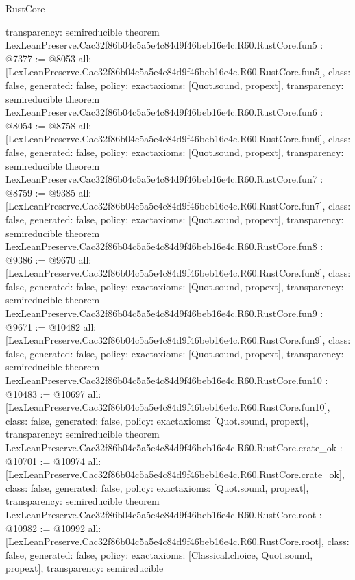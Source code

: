 \begin{lexlean}{RustCore}
\begin{coremodule}
{  transparency: semireducible
}
theorem LexLeanPreserve.Cac32f86b04c5a5e4c84d9f46beb16e4c.R60.RustCore.fun5 : @7377 := @8053 {
  all: [LexLeanPreserve.Cac32f86b04c5a5e4c84d9f46beb16e4c.R60.RustCore.fun5],
  class: false,
  generated: false,
  policy: exact{axioms: [Quot.sound, propext]},
  transparency: semireducible
}
theorem LexLeanPreserve.Cac32f86b04c5a5e4c84d9f46beb16e4c.R60.RustCore.fun6 : @8054 := @8758 {
  all: [LexLeanPreserve.Cac32f86b04c5a5e4c84d9f46beb16e4c.R60.RustCore.fun6],
  class: false,
  generated: false,
  policy: exact{axioms: [Quot.sound, propext]},
  transparency: semireducible
}
theorem LexLeanPreserve.Cac32f86b04c5a5e4c84d9f46beb16e4c.R60.RustCore.fun7 : @8759 := @9385 {
  all: [LexLeanPreserve.Cac32f86b04c5a5e4c84d9f46beb16e4c.R60.RustCore.fun7],
  class: false,
  generated: false,
  policy: exact{axioms: [Quot.sound, propext]},
  transparency: semireducible
}
theorem LexLeanPreserve.Cac32f86b04c5a5e4c84d9f46beb16e4c.R60.RustCore.fun8 : @9386 := @9670 {
  all: [LexLeanPreserve.Cac32f86b04c5a5e4c84d9f46beb16e4c.R60.RustCore.fun8],
  class: false,
  generated: false,
  policy: exact{axioms: [Quot.sound, propext]},
  transparency: semireducible
}
theorem LexLeanPreserve.Cac32f86b04c5a5e4c84d9f46beb16e4c.R60.RustCore.fun9 : @9671 := @10482 {
  all: [LexLeanPreserve.Cac32f86b04c5a5e4c84d9f46beb16e4c.R60.RustCore.fun9],
  class: false,
  generated: false,
  policy: exact{axioms: [Quot.sound, propext]},
  transparency: semireducible
}
theorem LexLeanPreserve.Cac32f86b04c5a5e4c84d9f46beb16e4c.R60.RustCore.fun10 : @10483 := @10697 {
  all: [LexLeanPreserve.Cac32f86b04c5a5e4c84d9f46beb16e4c.R60.RustCore.fun10],
  class: false,
  generated: false,
  policy: exact{axioms: [Quot.sound, propext]},
  transparency: semireducible
}
theorem LexLeanPreserve.Cac32f86b04c5a5e4c84d9f46beb16e4c.R60.RustCore.crate_ok : @10701 := @10974 {
  all: [LexLeanPreserve.Cac32f86b04c5a5e4c84d9f46beb16e4c.R60.RustCore.crate_ok],
  class: false,
  generated: false,
  policy: exact{axioms: [Quot.sound, propext]},
  transparency: semireducible
}
theorem LexLeanPreserve.Cac32f86b04c5a5e4c84d9f46beb16e4c.R60.RustCore.root : @10982 := @10992 {
  all: [LexLeanPreserve.Cac32f86b04c5a5e4c84d9f46beb16e4c.R60.RustCore.root],
  class: false,
  generated: false,
  policy: exact{axioms: [Classical.choice, Quot.sound, propext]},
  transparency: semireducible
}


\end{coremodule}
\end{lexlean}
